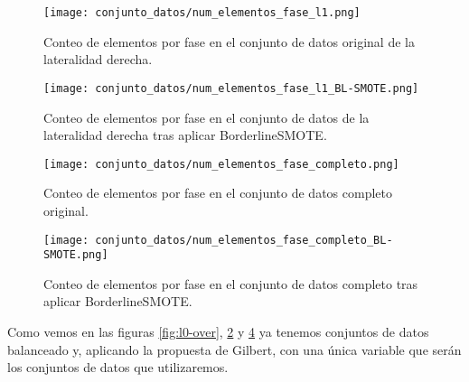 \begin{figure}[H]
    \centering
	  \texttt{[image: conjunto\_datos/num\_elementos\_fase\_l1.png]}
    \caption{Conteo de elementos por fase en el conjunto de datos original de la lateralidad derecha.}
	 \label{fig:l1-orig}
\end{figure}

\begin{figure}[H]
    \centering
     \texttt{[image: conjunto\_datos/num\_elementos\_fase\_l1\_BL-SMOTE.png]}
    \caption{Conteo de elementos por fase en el conjunto de datos de la lateralidad derecha tras aplicar BorderlineSMOTE.}
	 \label{fig:l1-over}
\end{figure}



\begin{figure}[H]
    \centering
	  \texttt{[image: conjunto\_datos/num\_elementos\_fase\_completo.png]}
     \label{fig:completo-orig}
    \caption{Conteo de elementos por fase en el conjunto de datos completo original.}

\end{figure}

\begin{figure}[H]
    \centering
     \texttt{[image: conjunto\_datos/num\_elementos\_fase\_completo\_BL-SMOTE.png]}
    \caption{Conteo de elementos por fase en el conjunto de datos completo tras aplicar BorderlineSMOTE.}
	 \label{fig:completo-over}
\end{figure}


Como vemos en las figuras \ref{fig:l0-over}, \ref{fig:l1-over} y \ref{fig:completo-over} ya tenemos conjuntos de datos balanceado y, aplicando la propuesta de Gilbert, con una única variable que serán los conjuntos de datos que utilizaremos.
